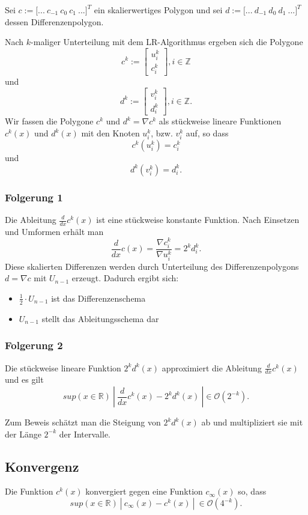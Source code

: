 Sei \(c := \lbrack ...~c_{-1}~c_0~c_1~...\rbrack^T\) ein skalierwertiges Polygon und sei \(d := \lbrack ...~d_{-1}~d_0~d_1~...\rbrack^T\) dessen Differenzenpolygon.

Nach \(k\)-maliger Unterteilung mit dem LR-Algorithmus ergeben sich die Polygone
\[c^k := \begin{bmatrix} u_i^k \\ c_i^k \end{bmatrix}, i \in \mathbb{Z}\]
und
\[d^k := \begin{bmatrix} v_i^k \\ d_i^k \end{bmatrix}, i \in \mathbb{Z}.\]
Wir fassen die Polygone \(c^k\) und \(d^k = \nabla c^k\) als stückweise lineare Funktionen \(c^k(x)\) und \(d^k(x)\) mit den Knoten \(u_i^k\), bzw. \(v_i^k\) auf, so dass
\[c^k(u_i^k) = c_i^k\]
und
\[d^k(v_i^k) = d_i^k.\]

\subsubsection{Folgerung 1}
Die Ableitung \(\frac{d}{dx}c^k(x)\) ist eine stückweise konstante Funktion. Nach Einsetzen und Umformen erhält man
\[\frac{d}{dx}c(x) = \frac{\nabla c_i^k}{\nabla u_i^k} = 2^k d_i^k.\]
Diese skalierten Differenzen werden durch Unterteilung des Differenzenpolygons \(d=\nabla c\) mit \(U_{n-1}\) erzeugt. Dadurch ergibt sich:

\begin{itemize}
	\item \(\frac{1}{2} \cdot U_{n-1}\) ist das Differenzenschema
	\item \(U_{n-1}\) stellt das Ableitungsschema dar
\end{itemize}

\subsubsection{Folgerung 2}
Die stückweise lineare Funktion \(2^k d^k(x)\) approximiert die Ableitung \(\frac{d}{dx} c^k(x)\) und es gilt
\[sup(x \in \mathbb{R})~|~\frac{d}{dx} c^k(x) - 2^k d^k(x)~| \in \mathcal{O}(2^{-k}).\]

Zum Beweis schätzt man die Steigung von \(2^kd^k(x)\) ab und multipliziert sie mit der Länge \(2^{-k}\) der Intervalle.

\subsection{Konvergenz}
Die Funktion \(c^k(x)\) konvergiert gegen eine Funktion \(c_{\infty}(x)\) so, dass
\[sup(x \in \mathbb{R})~|~c_{\infty}(x) - c^k(x)~|~\in \mathcal{O}(4^{-k}).\]

